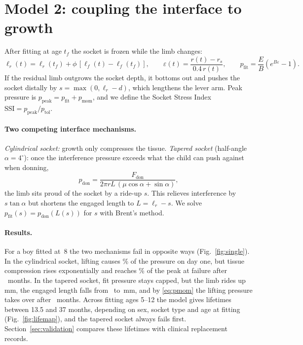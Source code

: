 \documentclass[11pt]{article}
\newcommand{\Ssi}{\mathrm{SSI}}
\begin{document}
\section{Model 2: coupling the interface to growth}\label{sec:coupling}
After fitting at age $t_f$ the socket is frozen while the limb changes:
\begin{equation}
\ell_r(t)=\ell_r(t_f)+\phi\,[\ell_f(t)-\ell_f(t_f)],\qquad
\varepsilon(t)=\frac{r(t)-r_s}{0.4\,r(t)},\qquad
p_{\mathrm{fit}}=\frac{E}{B}\left(e^{B\varepsilon}-1\right).
\end{equation}
If the residual limb outgrows the socket depth, it bottoms out and pushes the socket distally by $s=\max(0,\ell_r-d)$, which lengthens the lever arm. Peak pressure is $p_{\mathrm{peak}}=p_{\mathrm{fit}}+p_{\mathrm{mom}}$, and we define the Socket Stress Index $\Ssi=p_{\mathrm{peak}}/p_{\mathrm{tol}}$.

\paragraph{Two competing interface mechanisms.}
\emph{Cylindrical socket:} growth only compresses the tissue. \emph{Tapered socket} (half-angle $\alpha=4^\circ$): once the interference pressure exceeds what the child can push against when donning,
\begin{equation}
p_{\mathrm{don}}=\frac{F_{\mathrm{don}}}{2\pi rL\,(\mu\cos\alpha+\sin\alpha)},
\end{equation}
the limb sits proud of the socket by a ride-up $s$. This relieves interference by $s\tan\alpha$ but shortens the engaged length to $L=\ell_r-s$. We solve $p_{\mathrm{fit}}(s)=p_{\mathrm{don}}(L(s))$ for $s$ with Brent's method.

\paragraph{Results.} For a boy fitted at~8 the two mechanisms fail in opposite ways (Fig.~\ref{fig:single}). In the cylindrical socket, lifting causes \liftShare\% of the pressure on day one, but tissue compression rises exponentially and reaches \fitShareFail\% of the peak at failure after \lifeCyl\ months. In the tapered socket, fit pressure stays capped, but the limb rides up \rideUpFail\,mm, the engaged length falls from \engagedMM\ to \engagedFail\,mm, and by \eqref{eq:pmom} the lifting pressure takes over after \lifeTap\ months. Across fitting ages 5--12 the model gives lifetimes between 13.5 and 37 months, depending on sex, socket type and age at fitting (Fig.~\ref{fig:lifemap}), and the tapered socket always fails first. Section~\ref{sec:validation} compares these lifetimes with clinical replacement records.
\end{document}
